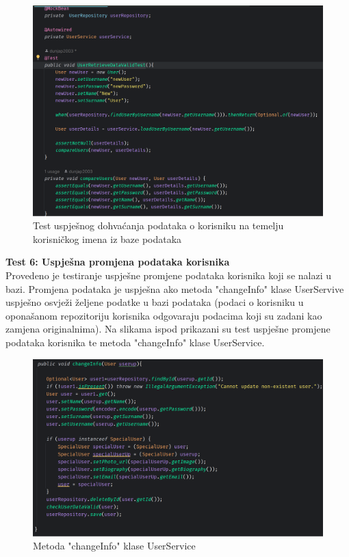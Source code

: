 						\begin{figure}[H]
			\includegraphics[scale=0.4]{slike/userRetrieveDataValidTest.PNG} %
			\centering
			\caption{Test uspješnog dohvaćanja podataka o korisniku na temelju korisničkog imena iz baze podataka}
			\label{Test uspješnog dohvaćanja podataka o korisniku na temelju korisničkog imena iz baze podataka}
		\end{figure}
		
\textbf{Test 6: Uspješna promjena podataka korisnika} \\
Provedeno je testiranje uspješne promjene podataka korisnika koji se nalazi u bazi. Promjena podataka je uspješna ako metoda "changeInfo" klase UserServive uspješno osvježi željene podatke u bazi podataka (podaci o korisniku u oponašanom repozitoriju korisnika odgovaraju podacima koji su zadani kao zamjena originalnima). Na slikama ispod prikazani su test uspješne promjene podataka korisnika te metoda "changeInfo" klase UserService.

				\begin{figure}[H]
			\includegraphics[scale=0.4]{slike/changeInfo.PNG} %
			\centering
			\caption{Metoda "changeInfo" klase UserService}
			\label{Metoda "changeInfo" klase UserService}
		\end{figure}
		
